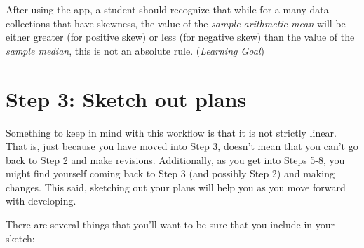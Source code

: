 \documentclass[
]{book}
\begin{document}
After using the app, a student should recognize that while for a many data collections that have skewness, the value of the \emph{sample arithmetic mean} will be either greater (for positive skew) or less (for negative skew) than the value of the \emph{sample median}, this is not an absolute rule. (\emph{Learning Goal})

\hypertarget{step3}{%
\section{Step 3: Sketch out plans}\label{step3}}

Something to keep in mind with this workflow is that it is not strictly linear. That is, just because you have moved into Step 3, doesn't mean that you can't go back to Step 2 and make revisions. Additionally, as you get into Steps 5-8, you might find yourself coming back to Step 3 (and possibly Step 2) and making changes. This said, sketching out your plans will help you as you move forward with developing.

There are several things that you'll want to be sure that you include in your sketch:
\end{document}
